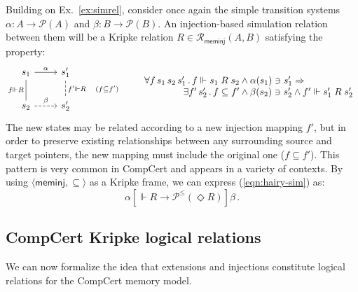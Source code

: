 \documentclass[acmsmall,authordraft]{acmart}
\newcommand{\kw}[1]{\ensuremath{ \mathsf{#1} }}
\newcommand{\ifr}[1]{\mathrel{[{#1}]}}
\begin{document}
\begin{example} \label{ex:sim} %
Building on Ex.~\ref{ex:simrel},
consider once again the simple transition systems
$\alpha : A \rightarrow \mathcal{P}(A)$ and
$\beta : B \rightarrow \mathcal{P}(B)$.
An injection-based simulation relation between them
will be a Kripke relation
$R \in \mathcal{R}_\kw{meminj}(A, B)$
satisfying the property:
\begin{equation}
    \label{eqn:hairy-sim}
  \begin{tikzcd}
    s_1 \arrow[r, "\alpha"]
        \arrow[d, dash, "f \Vdash R"'] &
    s_1' \arrow[d, dashed, dash, "f' \Vdash R \quad (f \subseteq f')"] \\
    s_2 \arrow[r, dashed, "\beta"] &
    s_2'
  \end{tikzcd}
  \qquad
    \begin{array}{r@{}l}
    \forall f \, s_1 \, s_2 \, s_1' \,.\,
      f \Vdash s_1 \mathrel{R} s_2 &{} \wedge
      \alpha(s_1) \ni s_1' \Rightarrow \\
    \exists f' \, s_2' \,.\,
      f \subseteq f' &{} \wedge
      \beta(s_2) \ni s_2' \wedge
      f' \Vdash s_1' \mathrel{R} s_2'
    \end{array}
\end{equation}
The new states may be related according to
a new injection mapping $f'$,
but in order to preserve existing relationships
between any surrounding source and target pointers,
the new mapping must include
the original one ($f \subseteq f'$).
This pattern is very common in CompCert
and appears in a variety of contexts.
By using $\langle \kw{meminj}, {\subseteq} \rangle$
as a Kripke frame,
we can express
(\ref{eqn:hairy-sim}) as:
\[
  \alpha \ifr{\Vdash R \rightarrow \mathcal{P}^\le(\Diamond R)} \beta \,.
\]
\end{example}


\subsection{CompCert Kripke logical relations} \label{sec:cklrdef} %

We can now formalize the idea that
extensions and injections
constitute logical relations for the CompCert memory model.
\end{document}
